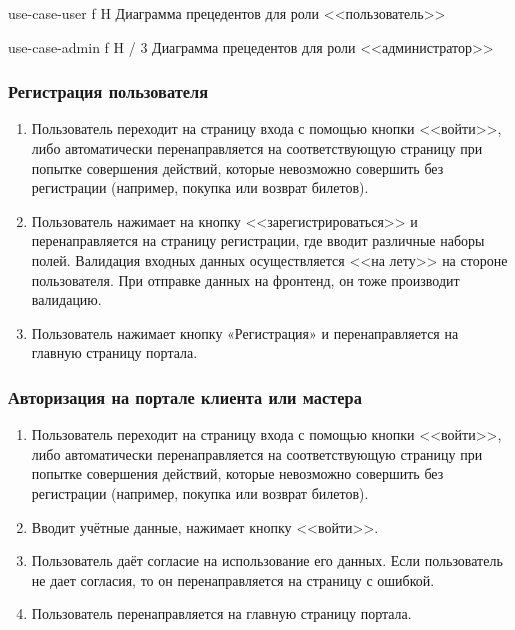 {use-case-user} %
{f} %
{H} %
{\textwidth} %
{Диаграмма прецедентов для роли <<пользователь>>} %

{use-case-admin} %
{f} %
{H} %
{\textwidth / 3} %
{Диаграмма прецедентов для роли <<администратор>>} %

\subsubsection*{Регистрация пользователя}
\begin{enumerate}
    \item Пользователь переходит на страницу входа с помощью кнопки <<войти>>, либо автоматически перенаправляется на соответствующую страницу при попытке совершения действий, которые невозможно совершить без регистрации (например, покупка или возврат билетов). 
    \item Пользователь нажимает на кнопку <<зарегистрироваться>> и перенаправляется на страницу регистрации, где вводит различные наборы полей. Валидация входных данных осуществляется <<на лету>> на стороне пользователя. При отправке данных на фронтенд, он тоже производит валидацию.
    \item Пользователь нажимает кнопку «Регистрация» и перенаправляется на главную страницу портала.
\end{enumerate}

\subsubsection*{Авторизация на портале клиента или мастера}
\begin{enumerate}
    \item Пользователь переходит на страницу входа с помощью кнопки <<войти>>, либо автоматически перенаправляется на соответствующую страницу при попытке совершения действий, которые невозможно совершить без регистрации (например, покупка или возврат билетов). 
    \item Вводит учётные данные, нажимает кнопку <<войти>>.
    \item Пользователь даёт согласие на использование его данных. Если пользователь не дает согласия, то он перенаправляется на страницу с ошибкой.
    \item Пользователь перенаправляется на главную страницу портала.
\end{enumerate} 

